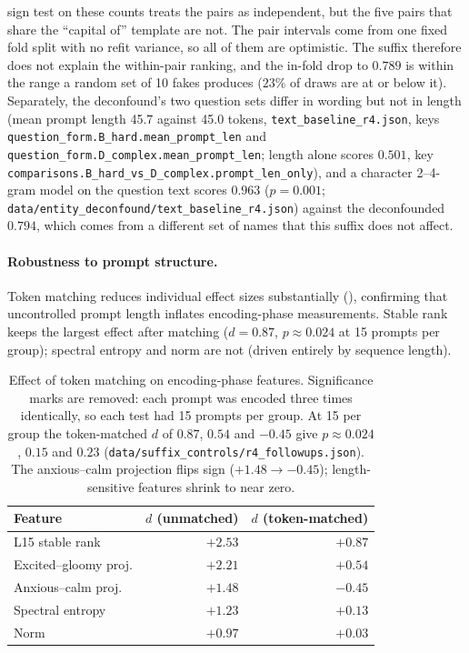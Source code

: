 \documentclass[11pt,a4paper]{article}
\begin{document}
sign test on these counts treats the pairs as independent, but the five
pairs that share the ``capital of'' template are not. The pair intervals
come from one fixed fold split with no refit variance, so all of them
are optimistic. The suffix therefore does not explain the within-pair
ranking, and the in-fold drop to $0.789$ is within the range a random set of 10 fakes produces ($23\%$ of draws are at or below it). Separately, the
deconfound's two question sets differ in wording but not in length (mean prompt length 45.7 against 45.0 tokens, \texttt{text\_baseline\_r4.json}, keys \texttt{question\_form.\allowbreak B\_hard.\allowbreak mean\_prompt\_len} and \texttt{question\_form.\allowbreak D\_complex.\allowbreak mean\_prompt\_len}; length alone scores $0.501$, key \texttt{comparisons.\allowbreak B\_hard\_vs\_D\_complex.\allowbreak prompt\_len\_only}), and a character 2--4-gram model on the question text scores $0.963$ ($p{=}0.001$; \texttt{data/\allowbreak entity\_deconfound/\allowbreak text\_baseline\_r4.json}) against the deconfounded $0.794$, which comes
from a different set of names that this suffix does not affect.

\paragraph{Robustness to prompt structure.} Token matching reduces
individual effect sizes substantially (), confirming
that uncontrolled prompt length inflates encoding-phase measurements.
Stable rank keeps the largest effect after matching ($d{=}0.87$, $p \approx 0.024$ at 15 prompts per group); spectral entropy
and norm are not (driven entirely by sequence length).

\begin{table}[H]
\centering
\caption{Effect of token matching on encoding-phase features. Significance marks are removed: each prompt was encoded three times identically, so each test had 15 prompts per group. At 15 per group the token-matched $d$ of $0.87$, $0.54$ and $-0.45$ give $p \approx 0.024$, $0.15$ and $0.23$ (\texttt{data/suffix\_controls/r4\_followups.json}). The anxious--calm projection flips sign ($+1.48 \to -0.45$); length-sensitive features shrink to near zero.}
\label{tab:robustness}
\begin{tabular}{lrr}
\toprule
Feature & $d$ (unmatched) & $d$ (token-matched) \\
\midrule
L15 stable rank & $+2.53$ & $+0.87$ \\
Excited--gloomy proj. & $+2.21$ & $+0.54$ \\
Anxious--calm proj. & $+1.48$ & $-0.45$ \\
Spectral entropy & $+1.23$ & $+0.13$ \\
Norm & $+0.97$ & $+0.03$ \\
\bottomrule
\end{tabular}
\end{table}
\end{document}

